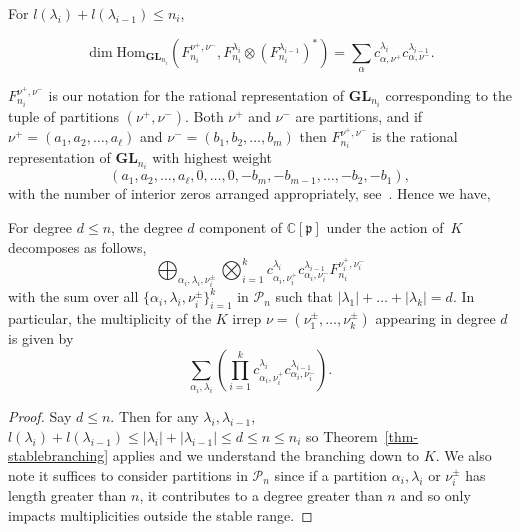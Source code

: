 \documentclass[ALCO,Unicode]{cedram}
\newcommand{\C}{\mathbb{C}}
\newcommand{\p}{\mathfrak{p}}
\newcommand{\GL}{\textbf{GL}}
\newcommand{\Par}{\mathcal{P}}
\newcommand{\Hom}{\text{Hom}}
\begin{document}
\begin{thm}  \label{thm-stablebranching}

For $l(\lambda_i) + l(\lambda_{i-1}) \leq n_i$,

$$\dim \Hom_{\GL_{n_i}}(F^{\nu^+, \nu^-}_{n_i}, F^{\lambda_i}_{n_i} \otimes (F^{\lambda_{i-1}}_{n_i})^*) = \sum_\alpha c^{\lambda_i}_{\alpha, \nu^+} c^{\lambda_{i-1}}_{\alpha, \nu^-}.$$


\end{thm}

$F_{n_i}^{\nu^+, \nu^-}$ is our notation for the rational representation of $\GL_{n_i}$ corresponding to the tuple of partitions $(\nu^+, \nu^-)$. Both $\nu^+$ and $\nu^-$ are partitions, and if $\nu^+ = (a_1,a_2,\dots,a_\ell)$ and $\nu^- = (b_1, b_2, \dots, b_m)$ then $F_{n_i}^{\nu^+, \nu^-}$ is the rational representation of $\GL_{n_i}$ with highest weight $$(a_1,a_2,\dots,a_\ell,0,\dots,0,-b_m,-b_{m-1},\dots,-b_2,-b_1),$$ with the number of interior zeros arranged appropriately, see~\cite{STEMBRIDGE198779}. Hence we have,

\begin{thm}
    For degree $d \leq n$, the degree $d$ component of $\C[\p]$ under the action of~$K$ decomposes as follows,
    $$\bigoplus_{\alpha_i, \lambda_i, \nu_i^\pm}\bigotimes_{i=1}^k
    c^{\lambda_i}_{\alpha_i, \nu_i^+} c^{\lambda_{i-1}}_{\alpha_i, \nu_i^-} 
    F^{\nu_i^+, \nu_i^-}_{n_i}$$
    with the sum over all $\{\alpha_i, \lambda_i, \nu_i^\pm\}_{i=1}^k$ in $\Par_n$ such that $|\lambda_1| + \dots + |\lambda_k| = d$. In particular, the multiplicity of the $K$ irrep $\nu = (\nu_1^\pm, \dots , \nu_k^\pm)$ appearing in degree $d$ is given by
    $$\sum_{\alpha_i, \lambda_i} (\prod_{i=1}^k
    c^{\lambda_i}_{\alpha_i, \nu_i^+} c^{\lambda_{i-1}}_{\alpha_i, \nu_i^-}).$$
    
\end{thm}

\begin{proof}
    Say $d \leq n$. Then for any $\lambda_i, \lambda_{i-1}$, $l(\lambda_i) + l(\lambda_{i-1}) \leq |\lambda_i| + |\lambda_{i-1}| \leq d \leq n \leq n_i$ so Theorem~\ref{thm-stablebranching} applies and we understand the branching down to $K$. We also note it suffices to consider partitions in $\Par_n$ since if a partition $\alpha_i, \lambda_i$ or $\nu_i^\pm$ has length greater than $n$, it contributes to a degree greater than $n$ and so only impacts multiplicities outside the stable range.
\end{proof}
\end{document}
